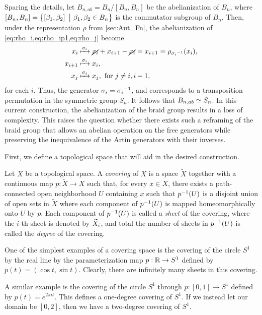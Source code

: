 Sparing the details, let $B_{n,ab} = B_n/\left[ B_n,B_n \right]$ be the abelianization of $B_n$, where $\left[ B_n,B_n \right]=\left\{ \left[ \beta_1,\beta_2 \right]~\big|~\beta_1,\beta_2\in B_n \right\}$ is the commutator subgroup of $B_n$. Then, under the representation $\rho$ from \cref{sec:Aut_Fn}, the abelianization of \cref{eq:rho_i,eq:rho_ip1,eq:rho_j} become
\begin{align}
    x_i &\xmapsto{\sigma_i} \cancel{x_i} + x_{i+1} - \cancel{x_i} = x_{i+1} = \rho_{{ \sigma_i }^{-1}}(x_i), \\
    x_{i+1} &\xmapsto{\sigma_i} x_i, \\
    x_j &\xmapsto{\sigma_i} x_j, \textrm{ for } j\neq i,i-1,
\end{align}
for each $i$. Thus, the generator $\sigma_i={ \sigma_i }^{-1}$, and corresponds to a transposition permutation in the symmetric group $S_n$. It follows that $B_{n,ab}\simeq S_n$. In this current construction, the abelianization of the braid group results in a loss of complexity. This raises the question whether there exists such a reframing of the braid group that allows an abelian operation on the free generators while preserving the inequivalence of the Artin generators with their inverses.

First, we define a topological space that will aid in the desired construction.
\begin{definition}
    Let $X$ be a topological space. A \textit{covering} of $X$ is a space $\widetilde{X}$ together with a continuous map $p:\widetilde{X}\to X$ such that, for every $x\in X$, there exists a path-connected open neighborhood $U$ containing $x$ such that ${ p }^{-1}(U)$ is a disjoint union of open sets in $\widetilde{X}$ where each component of ${ p }^{-1}(U)$ is mapped homeomorphically onto $U$ by $p$. Each component of ${ p }^{-1}(U)$ is called a \textit{sheet} of the covering, where the $i$-th sheet is denoted by $\widetilde{X}_{i}$, and total the number of sheets in ${ p }^{-1}(U)$ is called the \textit{degree} of the covering.
\end{definition}

\begin{example}
    One of the simplest examples of a covering space is the covering of the circle $S^1$ by the real line by the parameterization map $p:\mathbb{R}\to S^1$ defined by $p(t)=\left( \cos t,\sin t \right)$. Clearly, there are infinitely many sheets in this covering.
\end{example}

\begin{example}
    A similar example is the covering of the circle $S^1$ through $p:\left[ 0,1 \right]\to S^1$ defined by $p(t) = e^{2\pi it}$. This defines a one-degree covering of $S^1$. If we instead let our domain be $\left[ 0,2 \right]$, then we have a two-degree covering of $S^1$.
\end{example}

